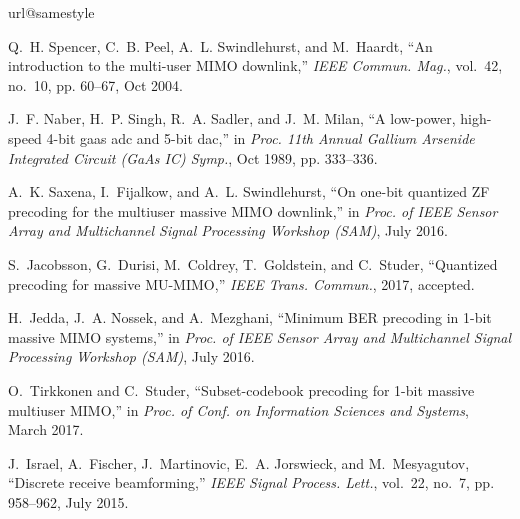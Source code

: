 \documentclass[journal,comsoc]{IEEEtran}
\begin{document}
\begin{thebibliography}{10}
\providecommand{\url}[1]{#1}
\csname url@samestyle\endcsname
\providecommand{\newblock}{\relax}
\providecommand{\bibinfo}[2]{#2}
\providecommand{\BIBentrySTDinterwordspacing}{\spaceskip=0pt\relax}
\providecommand{\BIBentryALTinterwordstretchfactor}{4}
\providecommand{\BIBentryALTinterwordspacing}{\spaceskip=\fontdimen2\font plus
\BIBentryALTinterwordstretchfactor\fontdimen3\font minus
  \fontdimen4\font\relax}
\providecommand{\BIBforeignlanguage}[2]{{%
\expandafter\ifx\csname l@#1\endcsname\relax
\typeout{** WARNING: IEEEtran.bst: No hyphenation pattern has been}%
\typeout{** loaded for the language `#1'. Using the pattern for}%
\typeout{** the default language instead.}%
\else
\language=\csname l@#1\endcsname
\fi
#2}}
\providecommand{\BIBdecl}{\relax}
\BIBdecl

Q.~H. Spencer, C.~B. Peel, A.~L. Swindlehurst, and M.~Haardt, ``An introduction
  to the multi-user {MIMO} downlink,'' \emph{{IEEE} Commun. Mag.}, vol.~42,
  no.~10, pp. 60--67, Oct 2004.

J.~F. Naber, H.~P. Singh, R.~A. Sadler, and J.~M. Milan, ``A low-power,
  high-speed 4-bit gaas adc and 5-bit dac,'' in \emph{Proc. 11th Annual Gallium
  Arsenide Integrated Circuit (GaAs IC) Symp.}, Oct 1989, pp. 333--336.

A.~K. Saxena, I.~Fijalkow, and A.~L. Swindlehurst, ``On one-bit quantized {ZF}
  precoding for the multiuser massive {MIMO} downlink,'' in \emph{Proc. of IEEE
  Sensor Array and Multichannel Signal Processing Workshop (SAM)}, July 2016.

S.~Jacobsson, G.~Durisi, M.~Coldrey, T.~Goldstein, and C.~Studer, ``Quantized
  precoding for massive {MU-MIMO},'' \emph{{IEEE} Trans. Commun.}, 2017,
  accepted.

H.~Jedda, J.~A. Nossek, and A.~Mezghani, ``Minimum {BER} precoding in 1-bit
  massive {MIMO} systems,'' in \emph{Proc. of IEEE Sensor Array and
  Multichannel Signal Processing Workshop (SAM)}, July 2016.

O.~Tirkkonen and C.~Studer, ``Subset-codebook precoding for 1-bit massive
  multiuser {MIMO},'' in \emph{Proc. of Conf. on Information Sciences and
  Systems}, March 2017.

J.~Israel, A.~Fischer, J.~Martinovic, E.~A. Jorswieck, and M.~Mesyagutov,
  ``Discrete receive beamforming,'' \emph{{IEEE} Signal Process. Lett.},
  vol.~22, no.~7, pp. 958--962, July 2015.


\end{thebibliography}
\end{document}

